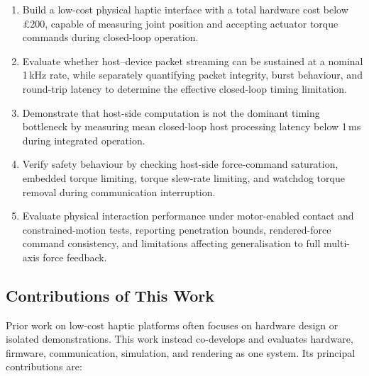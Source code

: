 \begin{enumerate}[label=(\roman*)]
	\item Build a low-cost physical haptic interface with a total hardware cost below £200, capable of measuring joint position and accepting actuator torque commands during closed-loop operation.
	\item Evaluate whether host--device packet streaming can be sustained at a nominal 1\,kHz rate, while separately quantifying packet integrity, burst behaviour, and round-trip latency to determine the effective closed-loop timing limitation.
	\item Demonstrate that host-side computation is not the dominant timing bottleneck by measuring mean closed-loop host processing latency below 1\,ms during integrated operation.
	\item Verify safety behaviour by checking host-side force-command saturation, embedded torque limiting, torque slew-rate limiting, and watchdog torque removal during communication interruption.
	\item Evaluate physical interaction performance under motor-enabled contact and constrained-motion tests, reporting penetration bounds, rendered-force command consistency, and limitations affecting generalisation to full multi-axis force feedback.
\end{enumerate}

\subsection{Contributions of This Work}

Prior work on low-cost haptic platforms often focuses on hardware design or isolated demonstrations. This work instead co-develops and evaluates hardware, firmware, communication, simulation, and rendering as one system. Its principal contributions are:

